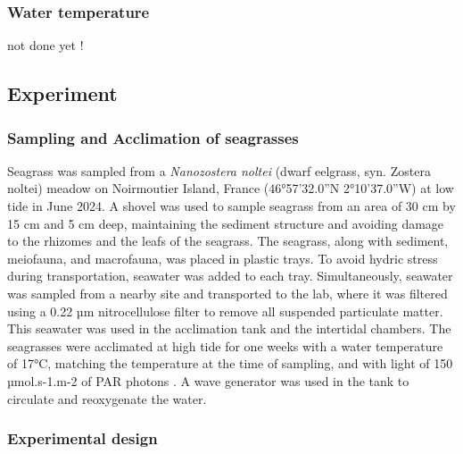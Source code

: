 \documentclass[
  number]{elsarticle}
\begin{document}
\subsubsection{Water temperature}\label{water-temperature}

not done yet !

\subsection{Experiment}\label{experiment}

\subsubsection{Sampling and Acclimation of
seagrasses}\label{sampling-and-acclimation-of-seagrasses}

Seagrass was sampled from a \emph{Nanozostera noltei} (dwarf eelgrass,
syn. Zostera noltei) meadow on Noirmoutier Island, France (46°57'32.0''N
2°10'37.0''W) at low tide in June 2024. A shovel was used to sample
seagrass from an area of 30 cm by 15 cm and 5 cm deep, maintaining the
sediment structure and avoiding damage to the rhizomes and the leafs of
the seagrass. The seagrass, along with sediment, meiofauna, and
macrofauna, was placed in plastic trays. To avoid hydric stress during
transportation, seawater was added to each tray. Simultaneously,
seawater was sampled from a nearby site and transported to the lab,
where it was filtered using a 0.22 µm nitrocellulose filter to remove
all suspended particulate matter. This seawater was used in the
acclimation tank and the intertidal chambers. The seagrasses were
acclimated at high tide for one weeks with a water temperature of 17°C,
matching the temperature at the time of sampling, and with light of 150
µmol.s-1.m-2 of PAR photons \citep{akbar2020mangrove}. A wave generator
was used in the tank to circulate and reoxygenate the water.

\subsubsection{Experimental design}\label{experimental-design}
\end{document}
